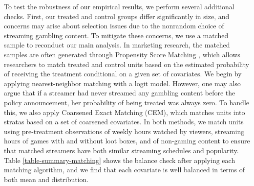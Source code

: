\documentclass[a4paper,12pt]{article}
\begin{document}
To test the robustness of our empirical results, we perform several additional checks. First, our treated and control groups differ significantly in size, and concerns may arise about selection issues due to the nonrandom choice of streaming gambling content. To mitigate these concerns, we use a matched sample to reconduct our main analysis. In marketing research, the matched samples are often generated through Propensity Score Matching \citep{angrist2009mostly}, which allows researchers to match treated and control units based on the estimated probability of receiving the treatment conditional on a given set of covariates. We begin by applying nearest-neighbor matching with a logit model. However, one may also argue that if a streamer had never streamed any gambling content before the policy announcement, her probability of being treated was always zero. To handle this, we also apply Coarsened Exact Matching (CEM), which matches units into stratas based on a set of coarsened covariates. In both methods, we match units using pre-treatment observations of weekly hours watched by viewers, streaming hours of games with and without loot boxes, and of non-gaming content to ensure that matched streamers have both similar streaming schedules and popularity. Table \ref{table-summary-matching} shows the balance check after applying each matching algorithm, and we find that each covariate is well balanced in terms of both mean and distribution.
\end{document}
